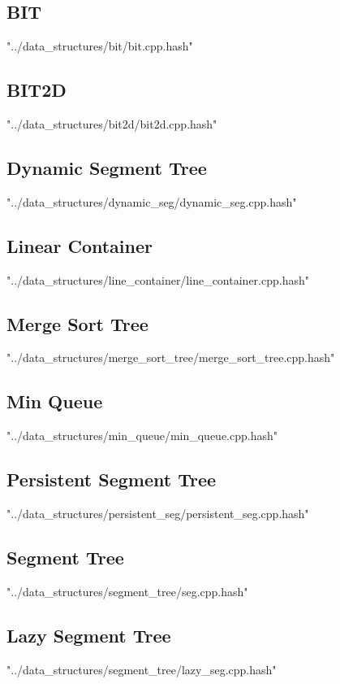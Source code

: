 \documentclass [12pt,onecolumn,oneside]{article}
\begin{document}
\subsection{ BIT}
 {"../data_structures/bit/bit.cpp.hash"}
\newpage

\subsection{ BIT2D}
 {"../data_structures/bit2d/bit2d.cpp.hash"}
\newpage

\subsection{ Dynamic Segment Tree}
 {"../data_structures/dynamic_seg/dynamic_seg.cpp.hash"}
\newpage

\subsection{ Linear Container}
 {"../data_structures/line_container/line_container.cpp.hash"}
\newpage

\subsection{ Merge Sort Tree}
 {"../data_structures/merge_sort_tree/merge_sort_tree.cpp.hash"}
\newpage

\subsection{ Min Queue}
 {"../data_structures/min_queue/min_queue.cpp.hash"}
\newpage

\subsection{ Persistent Segment Tree}
 {"../data_structures/persistent_seg/persistent_seg.cpp.hash"}
\newpage

\subsection{ Segment Tree}
 {"../data_structures/segment_tree/seg.cpp.hash"}
\newpage

\subsection{ Lazy Segment Tree}
 {"../data_structures/segment_tree/lazy_seg.cpp.hash"}
\newpage
\end{document}
